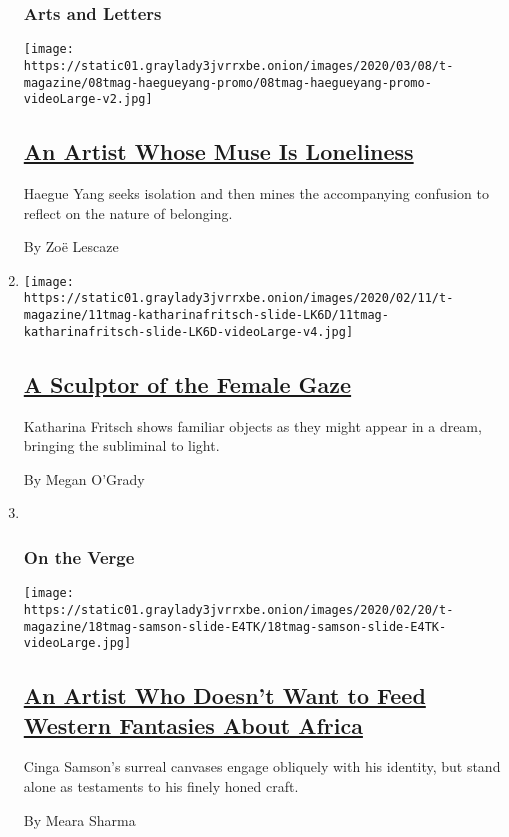 \begin{enumerate}
{  \subsubsection{Arts and Letters}\label{arts-and-letters}}

  \texttt{[image: https://static01.graylady3jvrrxbe.onion/images/2020/03/08/t-magazine/08tmag-haegueyang-promo/08tmag-haegueyang-promo-videoLarge-v2.jpg]}

  \hypertarget{an-artist-whose-muse-is-loneliness}{%
  \subsection{\texorpdfstring{\href{/2020/02/26/t-magazine/haegue-yang.html}{An
  Artist Whose Muse Is
  Loneliness}}{An Artist Whose Muse Is Loneliness}}\label{an-artist-whose-muse-is-loneliness}}

  Haegue Yang seeks isolation and then mines the accompanying confusion
  to reflect on the nature of belonging.

  By Zoë Lescaze
\item
  \texttt{[image: https://static01.graylady3jvrrxbe.onion/images/2020/02/11/t-magazine/11tmag-katharinafritsch-slide-LK6D/11tmag-katharinafritsch-slide-LK6D-videoLarge-v4.jpg]}

  \hypertarget{a-sculptor-of-the-female-gaze}{%
  \subsection{\texorpdfstring{\href{/2020/02/12/t-magazine/katharina-fritsch-artist.html}{A
  Sculptor of the Female
  Gaze}}{A Sculptor of the Female Gaze}}\label{a-sculptor-of-the-female-gaze}}

  Katharina Fritsch shows familiar objects as they might appear in a
  dream, bringing the subliminal to light.

  By Megan O'Grady
\item ~
  \hypertarget{on-the-verge}{%
  \subsubsection{On the Verge}\label{on-the-verge}}

  \texttt{[image: https://static01.graylady3jvrrxbe.onion/images/2020/02/20/t-magazine/18tmag-samson-slide-E4TK/18tmag-samson-slide-E4TK-videoLarge.jpg]}

  \hypertarget{an-artist-who-doesnt-want-to-feed-western-fantasies-about-africa}{%
  \subsection{\texorpdfstring{\href{/2020/02/21/t-magazine/cinga-samson.html}{An
  Artist Who Doesn't Want to Feed Western Fantasies About
  Africa}}{An Artist Who Doesn't Want to Feed Western Fantasies About Africa}}\label{an-artist-who-doesnt-want-to-feed-western-fantasies-about-africa}}

  Cinga Samson's surreal canvases engage obliquely with his identity,
  but stand alone as testaments to his finely honed craft.

  By Meara Sharma
\end{enumerate}

